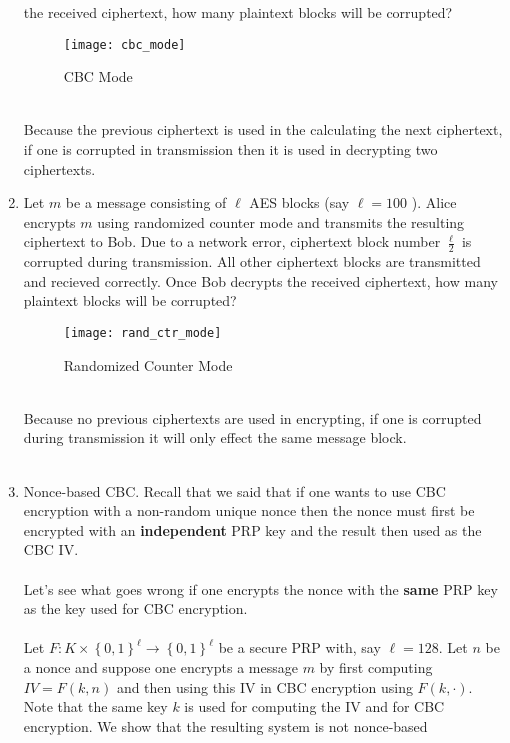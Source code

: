 \documentclass[a4paper,12pt]{article}
\begin{document}
\begin{enumerate}
			the received ciphertext, how many plaintext blocks will be corrupted?\\
			\begin{figure}[h!]
				\centering
				\texttt{[image: cbc\_mode]}
				\caption{CBC Mode}
				\label{fig:cbc_mode}
			\end{figure}
			\\Because the previous ciphertext is used in the calculating the next ciphertext,
			if one is corrupted in transmission then it is used in decrypting two ciphertexts.
			\pagebreak
		\item Let $m$ be a message consisting of $\ell$ AES blocks (say $\ell=100$ ). Alice encrypts
                        $m$ using randomized counter mode and transmits the resulting ciphertext to Bob.
			Due to a network error, ciphertext block number $\frac{\ell}{2}$ is corrupted during
			transmission. All other ciphertext blocks are transmitted and recieved correctly.
			Once Bob decrypts the received ciphertext, how many plaintext blocks will be corrupted?
			\begin{figure}[h!]
				\centering
				\texttt{[image: rand\_ctr\_mode]}
				\caption{Randomized Counter Mode}
				\label{fig:rand_ctr_mode}
			\end{figure}
			\\
			Because no previous ciphertexts are used in encrypting, if one is corrupted during
			transmission it will only effect the same message block.\\\\
		\item Nonce-based CBC. Recall that we said that if one wants to use CBC encryption with a
			non-random unique nonce then the nonce must first be encrypted with an \textbf{independent}
			PRP key and the result then used as the CBC IV.\\
			\\
			Let's see what goes wrong if one encrypts the nonce with the \textbf{same} PRP key as
			the key used for CBC encryption.\\
			\\
			Let $F:K\times \left\{ 0,1 \right\}^{\ell} \to \left\{ 0,1 \right\}^{\ell}$ be a secure
			PRP with, say $\ell=128$. Let $n$ be a nonce and suppose one encrypts a message $m$
			by first computing  $IV=F\left( k,n \right)$ and then using this IV in CBC encryption
			using $F\left( k,\cdot \right)$. Note that the same key $k$ is used for computing
			the IV and for CBC encryption. We show that the resulting system is not nonce-based

\end{enumerate}
\end{document}
